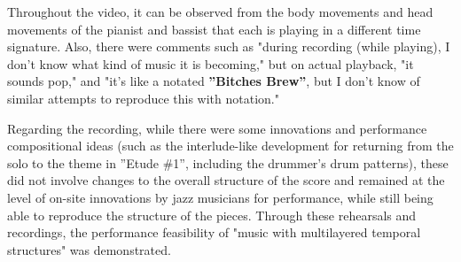 Throughout the video, it can be observed from the body movements and head movements of the pianist and bassist that each is playing in a different time signature. Also, there were comments such as "during recording (while playing), I don't know what kind of music it is becoming," but on actual playback, "it sounds pop," and "it's like a notated {\bf ''Bitches Brew''}\cite{miles:02}, but I don't know of similar attempts to reproduce this with notation."

Regarding the recording, while there were some innovations and performance compositional ideas (such as the interlude-like development for returning from the solo to the theme in ''Etude \#1'', including the drummer's drum patterns), these did not involve changes to the overall structure of the score and remained at the level of on-site innovations by jazz musicians for performance, while still being able to reproduce the structure of the pieces. Through these rehearsals and recordings, the performance feasibility of "music with multilayered temporal structures" was demonstrated.
